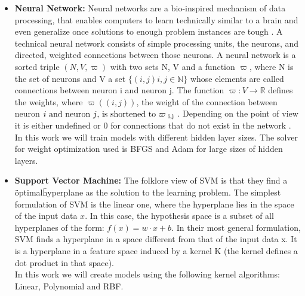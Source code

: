 \begin{itemize}
\item \textbf{Neural Network: }
Neural networks are a bio-inspired mechanism of data processing, that enables computers to learn technically similar to a brain and even generalize once solutions to enough problem instances are tough \cite{Kriesel2007NeuralNetworks}. A technical neural network consists of simple processing units, the neurons, and directed, weighted connections between those neurons. A neural network is a sorted triple \((N, V, \varpi )\) with two sets N, V and a  function \(\varpi\), where N is the set of neurons and V a set \(\{ (i, j) i, j \in \mathbb{N} \}\)  whose elements are called connections between neuron i and neuron j. The function \( \varpi : V \rightarrow \mathbb{R}\) defines the weights, where \(\varpi((i, j))\), the weight of the connection between neuron \(i$ and neuron \(j$, is shortened to \(\varpi \textsubscript{ i,j}\) . Depending on the point of view it is either undefined or 0 for connections that do not exist in the network \cite{Kriesel2007NeuralNetworks}.  \\
In this work we will train models with different hidden layer sizes. The solver for weight optimization used is BFGS\cite{Dai2013} and Adam\cite{adamNN} for large sizes of hidden layers.

\item \textbf{Support Vector Machine: }
The folklore view of SVM is that they find a \"optimal\" hyperplane as the solution to the learning problem. The simplest formulation of SVM is the linear one, where the hyperplane lies in the space of the input data \(x\). In this case, the hypothesis space is a subset of all hyperplanes of the form:
\(f(x) = w \cdotp x +b\).
In their most general formulation, SVM finds a hyperplane in a space different from that of the input data x. It is a hyperplane in a feature space induced by a kernel K (the kernel defines a dot product in that space)\cite{SVMEvgeniou}.\\
In this work we will create models using the following kernel algorithms: Linear\cite{SVMTraining}, Polynomial\cite{SVMTraining} and RBF\cite{SVMTraining}.  
\end{itemize}







